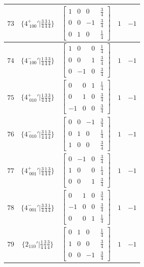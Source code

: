 \documentclass[fleqn,8pt]{jsarticle}
\begin{document}
\begin{longtable}{ccccc}
$ 73 $ & $ \{4^{+}_{\,\,100}{}'|\frac{3}{4} \frac{3}{4} \frac{1}{4}\} $ & $ \begin{bmatrix} 1 & 0 & 0 & \frac{3}{4} \\ 0 & 0 & -1 & \frac{3}{4} \\ 0 & 1 & 0 & \frac{1}{4} \end{bmatrix} $ & $ 1 $ & $ -1 $ \\ \hline
$ 74 $ & $ \{4^{-}_{\,\,100}{}'|\frac{1}{4} \frac{3}{4} \frac{3}{4}\} $ & $ \begin{bmatrix} 1 & 0 & 0 & \frac{1}{4} \\ 0 & 0 & 1 & \frac{3}{4} \\ 0 & -1 & 0 & \frac{3}{4} \end{bmatrix} $ & $ 1 $ & $ -1 $ \\ \hline
$ 75 $ & $ \{4^{+}_{\,\,010}{}'|\frac{1}{4} \frac{3}{4} \frac{3}{4}\} $ & $ \begin{bmatrix} 0 & 0 & 1 & \frac{1}{4} \\ 0 & 1 & 0 & \frac{3}{4} \\ -1 & 0 & 0 & \frac{3}{4} \end{bmatrix} $ & $ 1 $ & $ -1 $ \\ \hline
$ 76 $ & $ \{4^{-}_{\,\,010}{}'|\frac{3}{4} \frac{1}{4} \frac{3}{4}\} $ & $ \begin{bmatrix} 0 & 0 & -1 & \frac{3}{4} \\ 0 & 1 & 0 & \frac{1}{4} \\ 1 & 0 & 0 & \frac{3}{4} \end{bmatrix} $ & $ 1 $ & $ -1 $ \\ \hline
$ 77 $ & $ \{4^{+}_{\,\,001}{}'|\frac{3}{4} \frac{1}{4} \frac{3}{4}\} $ & $ \begin{bmatrix} 0 & -1 & 0 & \frac{3}{4} \\ 1 & 0 & 0 & \frac{1}{4} \\ 0 & 0 & 1 & \frac{3}{4} \end{bmatrix} $ & $ 1 $ & $ -1 $ \\ \hline
$ 78 $ & $ \{4^{-}_{\,\,001}{}'|\frac{3}{4} \frac{3}{4} \frac{1}{4}\} $ & $ \begin{bmatrix} 0 & 1 & 0 & \frac{3}{4} \\ -1 & 0 & 0 & \frac{3}{4} \\ 0 & 0 & 1 & \frac{1}{4} \end{bmatrix} $ & $ 1 $ & $ -1 $ \\ \hline
$ 79 $ & $ \{2{}_{110}{}'|\frac{1}{4} \frac{3}{4} \frac{3}{4}\} $ & $ \begin{bmatrix} 0 & 1 & 0 & \frac{1}{4} \\ 1 & 0 & 0 & \frac{3}{4} \\ 0 & 0 & -1 & \frac{3}{4} \end{bmatrix} $ & $ 1 $ & $ -1 $ \\ \hline

\end{longtable}
\end{document}
